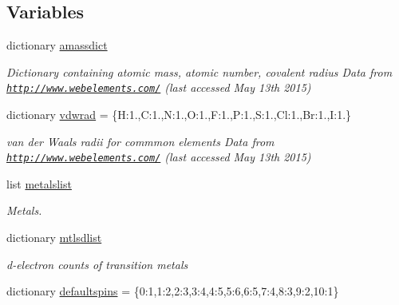 \subsection*{Variables}
\begin{DoxyCompactItemize}
\item 
dictionary \hyperlink{namespacemolSimplify_1_1Classes_1_1globalvars_aecbcb6a8a3ae644971d886fd42b18f8f}{amassdict}
\begin{DoxyCompactList}\small\item\em Dictionary containing atomic mass, atomic number, covalent radius Data from \href{http://www.webelements.com/}{\tt http\+://www.\+webelements.\+com/} (last accessed May 13th 2015) \end{DoxyCompactList}\item 
dictionary \hyperlink{namespacemolSimplify_1_1Classes_1_1globalvars_a86110c75ee87bdc8a8d452c9a090ba23}{vdwrad} = \{\textquotesingle{}H\textquotesingle{}\+:1.,\textquotesingle{}C\textquotesingle{}\+:1.,\textquotesingle{}N\textquotesingle{}\+:1.,\textquotesingle{}O\textquotesingle{}\+:1.,\textquotesingle{}F\textquotesingle{}\+:1.,\textquotesingle{}P\textquotesingle{}\+:1.,\textquotesingle{}S\textquotesingle{}\+:1.,\textquotesingle{}Cl\textquotesingle{}\+:1.,\textquotesingle{}Br\textquotesingle{}\+:1.,\textquotesingle{}I\textquotesingle{}\+:1.\}
\begin{DoxyCompactList}\small\item\em van der Waals radii for commmon elements Data from \href{http://www.webelements.com/}{\tt http\+://www.\+webelements.\+com/} (last accessed May 13th 2015) \end{DoxyCompactList}\item 
list \hyperlink{namespacemolSimplify_1_1Classes_1_1globalvars_a75501e43d0d5a32c4a404f9bf3b7509d}{metalslist}
\begin{DoxyCompactList}\small\item\em Metals. \end{DoxyCompactList}\item 
dictionary \hyperlink{namespacemolSimplify_1_1Classes_1_1globalvars_a192a3a4c3d1b790d47c670234be91e95}{mtlsdlist}
\begin{DoxyCompactList}\small\item\em d-\/electron counts of transition metals \end{DoxyCompactList}\item 
dictionary \hyperlink{namespacemolSimplify_1_1Classes_1_1globalvars_a1123abd692e68167072bb6a13c6bbc95}{defaultspins} = \{0\+:\textquotesingle{}1\textquotesingle{},1\+:\textquotesingle{}2\textquotesingle{},2\+:\textquotesingle{}3\textquotesingle{},3\+:\textquotesingle{}4\textquotesingle{},4\+:\textquotesingle{}5\textquotesingle{},5\+:\textquotesingle{}6\textquotesingle{},6\+:\textquotesingle{}5\textquotesingle{},7\+:\textquotesingle{}4\textquotesingle{},8\+:\textquotesingle{}3\textquotesingle{},9\+:\textquotesingle{}2\textquotesingle{},10\+:\textquotesingle{}1\textquotesingle{}\}

\end{DoxyCompactItemize}

